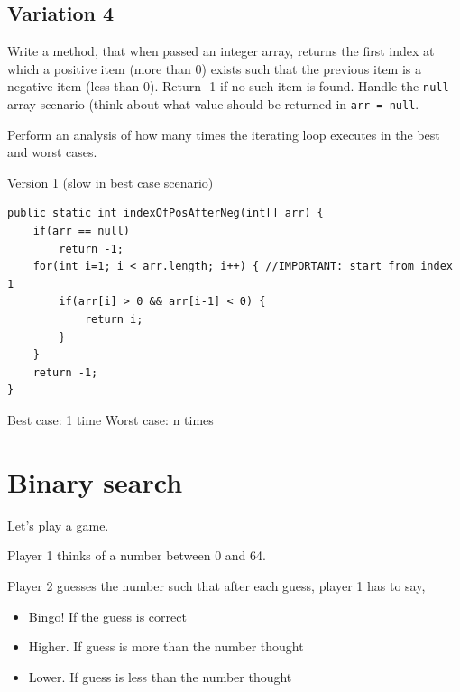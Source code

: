 \subsection{Variation 4}

\begin{exercise}
Write a method, that when passed an integer array, returns the first index at which a positive item (more than 0) exists such that the previous item is a negative item (less than 0). Return -1 if no such item is found. Handle the \texttt{null} array scenario (think about what value should be returned in \texttt{arr = null}.

Perform an analysis of how many times the iterating loop executes in the best and worst cases.
\end{exercise}
\begin{answer}
Version 1 (slow in best case scenario)
\begin{lstlisting}
public static int indexOfPosAfterNeg(int[] arr) {
	if(arr == null)
		return -1;
	for(int i=1; i < arr.length; i++) { //IMPORTANT: start from index 1
		if(arr[i] > 0 && arr[i-1] < 0) {
			return i;
		}
	}
	return -1;
}
\end{lstlisting}	
Best case: 1 time
Worst case: n times
\end{answer}

\section{Binary search}

Let's play a game.

Player 1 thinks of a number between 0 and 64. 
\vskip 1cm
\vskip 1cm

Player 2 guesses the number such that after each guess, player 1 has to say,

\begin{itemize}
\item Bingo! If the guess is correct
\item Higher. If guess is more than the number thought	
\item Lower. If guess is less than the number thought	
\end{itemize}

